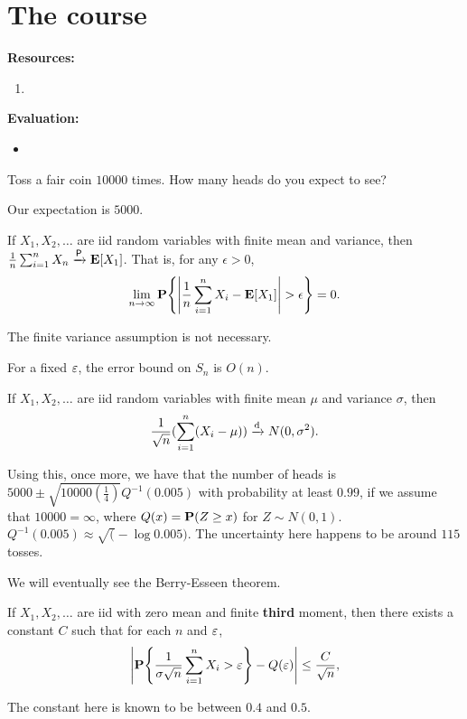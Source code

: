 \chapter*{The course}

\textbf{Resources:}
\begin{enumerate}
    \item
\end{enumerate}
\vspace{1em}
\textbf{Evaluation:}
\begin{itemize}
    \item
\end{itemize}

\begin{question}
    Toss a fair coin $10000$ times.
    How many heads do you expect to see?
\end{question}
Our expectation is $5000$.

\begin{theorem} \label{thm:wlln}
    If $X_1, X_2, \dots$ are iid random variables with finite mean and
    variance, then $\frac1n \sum_{i=1}^n X_n \pto \E[X_1]$.
    That is, for any $\epsilon > 0$, \[
        \lim_{n \to \infty}
            \P\set*{\abs*{\frac1n \sum_{i=1}^n X_i - \E[X_1]} > \epsilon} = 0.
    \]
\end{theorem}
The finite variance assumption is not necessary.

For a fixed $\eps$, the error bound on $S_n$ is $O(n)$.

\begin{theorem} \label{thm:clt}
    If $X_1, X_2, \dots$ are iid random variables with finite mean $\mu$
    and variance $\sigma$, then \[
        \frac1{\sqrt n} (\sum_{i=1}^n (X_i - \mu)) \dto N(0, \sigma^2).
    \]
\end{theorem}
Using this, once more, we have that the number of heads is
$5000 \pm \sqrt{10000 (\frac14)} Q^{-1}(0.005)$ with probability
at least $0.99$, if we assume that $10000 = \infty$,
where $Q(x) = \P(Z \ge x)$ for $Z \sim N(0, 1)$.
$Q^{-1}(0.005) \approx \sqrt(-\log 0.005)$.
The uncertainty here happens to be around $115$ tosses.

We will eventually see the Berry-Esseen theorem.
\begin{theorem} \label{thm:berry}
    If $X_1, X_2, \dots$ are iid with zero mean and finite \textbf{third}
    moment, then there exists a constant $C$ such that for each
    $n$ and $\eps$, \[
        \abs*{\P \set*{\frac1{\sigma \sqrt n} \sum_{i=1}^n X_i > \eps}
            - Q(\eps)} \le \frac{C}{\sqrt n},
    \]
\end{theorem}
The constant here is known to be between $0.4$ and $0.5$.


